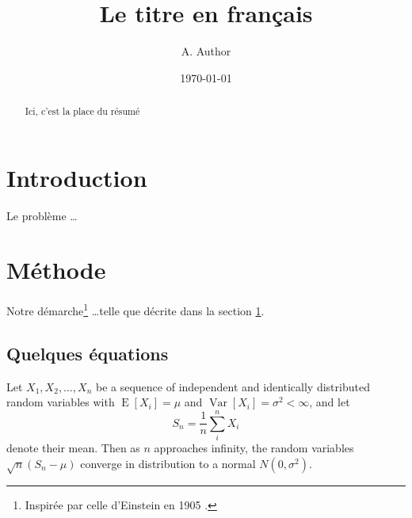 \documentclass[a4paper, french]{article}
\title{Le titre en français}
\author{A. Author}
\date{\today}
\begin{document}
\maketitle

\begin{abstract}
Ici, c'est la place du résumé
\end{abstract}

\section{Introduction}
\label{sec:intro}

Le problème \ldots

\section{Méthode}
\label{sec:methode}

Notre démarche\footnote{Inspirée par celle d'Einstein en 1905 \cite{einstein1905electrodynamics}.} \ldots telle que décrite dans la section \ref{sec:intro}.

\subsection{Quelques équations}

Let $X_1, X_2, \ldots, X_n$ be a sequence of independent and
identically distributed random variables with
$\operatorname{E}[X_i] = \mu$ and
$\operatorname{Var}[X_i] = \sigma^2 < \infty$, and let
\begin{equation*}
S_n = \frac{1}{n}\sum_{i}^{n} X_i
\end{equation*}
denote their mean. Then as $n$ approaches infinity, the
random variables $\sqrt{n}(S_n - \mu)$ converge in
distribution to a normal $N(0, \sigma^2)$.
\end{document}
